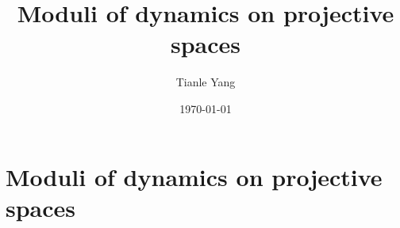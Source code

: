 \documentclass[sectionlevel=section,status=draft]{noteformyself}
\title{Moduli of dynamics on projective spaces}
\author{Tianle Yang}
\date{\today}
\begin{document}
\maketitle

    \section[
      status=draft,
      tag=00000,
      label=\labelNFM{sec:endomorphisms-on-projective-spaces:moduli-of-dynamics-on-projective-spaces}
    ]{Moduli of dynamics on projective spaces}



\printbibliography[heading=bibintoc, title={References}]
\end{document}
